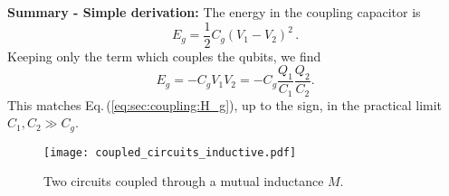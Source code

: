 \textbf{Summary - Simple derivation:} The energy in the coupling capacitor is
\begin{equation*}
  E_g = \frac{1}{2} C_g \left( V_1 - V_2 \right)^2 \, .
\end{equation*}
Keeping only the term which couples the qubits, we find \begin{equation}
E_g = -C_g V_1 V_2 = -C_g \frac{Q_1}{C_1} \frac{Q_2}{C_2} . \end{equation}
This matches Eq.\,(\ref{eq:sec:coupling:H_g}), up to the sign, in the practical limit $C_1,C_2 \gg C_g$.


\begin{figure}
\begin{centering}
\texttt{[image: coupled\_circuits\_inductive.pdf]}
\par\end{centering}
\caption{Two circuits coupled through a mutual inductance $M$.}
\label{Fig:coupledCircuits_inductive}
\end{figure}

